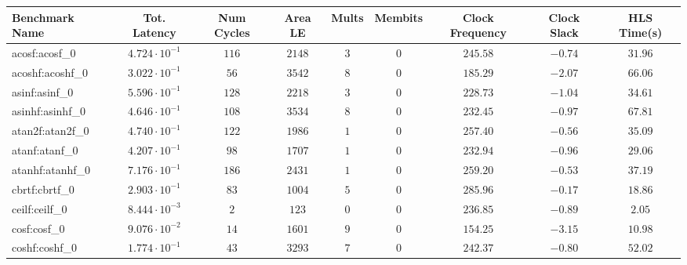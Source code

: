 \begin{tabular}{|l|c|c|c|c|c|c|c|c|}
\hline
Benchmark Name               & Tot. Latency            & Num Cycles & Area LE   & Mults   & Membits & Clock Frequency & Clock Slack & HLS Time(s) \\
\hline
acosf:acosf\_0               & $ 4.724 \cdot 10^{-1} $ & $ 116    $ & $ 2148  $ & $ 3   $ & $ 0   $ & $ 245.58      $ & $ -0.74   $ & $ 31.96   $ \\
acoshf:acoshf\_0             & $ 3.022 \cdot 10^{-1} $ & $ 56     $ & $ 3542  $ & $ 8   $ & $ 0   $ & $ 185.29      $ & $ -2.07   $ & $ 66.06   $ \\
asinf:asinf\_0               & $ 5.596 \cdot 10^{-1} $ & $ 128    $ & $ 2218  $ & $ 3   $ & $ 0   $ & $ 228.73      $ & $ -1.04   $ & $ 34.61   $ \\
asinhf:asinhf\_0             & $ 4.646 \cdot 10^{-1} $ & $ 108    $ & $ 3534  $ & $ 8   $ & $ 0   $ & $ 232.45      $ & $ -0.97   $ & $ 67.81   $ \\
atan2f:atan2f\_0             & $ 4.740 \cdot 10^{-1} $ & $ 122    $ & $ 1986  $ & $ 1   $ & $ 0   $ & $ 257.40      $ & $ -0.56   $ & $ 35.09   $ \\
atanf:atanf\_0               & $ 4.207 \cdot 10^{-1} $ & $ 98     $ & $ 1707  $ & $ 1   $ & $ 0   $ & $ 232.94      $ & $ -0.96   $ & $ 29.06   $ \\
atanhf:atanhf\_0             & $ 7.176 \cdot 10^{-1} $ & $ 186    $ & $ 2431  $ & $ 1   $ & $ 0   $ & $ 259.20      $ & $ -0.53   $ & $ 37.19   $ \\
cbrtf:cbrtf\_0               & $ 2.903 \cdot 10^{-1} $ & $ 83     $ & $ 1004  $ & $ 5   $ & $ 0   $ & $ 285.96      $ & $ -0.17   $ & $ 18.86   $ \\
ceilf:ceilf\_0               & $ 8.444 \cdot 10^{-3} $ & $ 2      $ & $ 123   $ & $ 0   $ & $ 0   $ & $ 236.85      $ & $ -0.89   $ & $ 2.05    $ \\
cosf:cosf\_0                 & $ 9.076 \cdot 10^{-2} $ & $ 14     $ & $ 1601  $ & $ 9   $ & $ 0   $ & $ 154.25      $ & $ -3.15   $ & $ 10.98   $ \\
coshf:coshf\_0               & $ 1.774 \cdot 10^{-1} $ & $ 43     $ & $ 3293  $ & $ 7   $ & $ 0   $ & $ 242.37      $ & $ -0.80   $ & $ 52.02   $ \\

\end{tabular}
